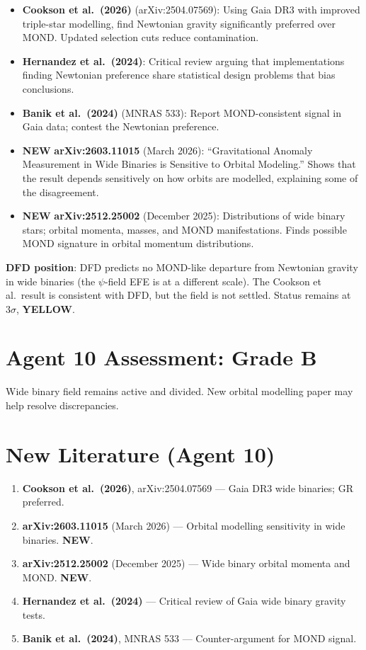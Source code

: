 \documentclass[11pt,a4paper]{article}
\newcommand{\YELLOW}{\textcolor{dfdyellow}{\textbf{YELLOW}}}
\newcommand{\NEW}{\textcolor{dfdblue}{\textbf{NEW}}}
\begin{document}
\begin{itemize}
\item \textbf{Cookson et al.\ (2026)} (arXiv:2504.07569): Using Gaia DR3 with improved triple-star modelling, find Newtonian gravity significantly preferred over MOND. Updated selection cuts reduce contamination.
\item \textbf{Hernandez et al.\ (2024)}: Critical review arguing that implementations finding Newtonian preference share statistical design problems that bias conclusions.
\item \textbf{Banik et al.\ (2024)} (MNRAS 533): Report MOND-consistent signal in Gaia data; contest the Newtonian preference.
\item \NEW{} \textbf{arXiv:2603.11015} (March 2026): ``Gravitational Anomaly Measurement in Wide Binaries is Sensitive to Orbital Modeling.'' Shows that the result depends sensitively on how orbits are modelled, explaining some of the disagreement.
\item \NEW{} \textbf{arXiv:2512.25002} (December 2025): Distributions of wide binary stars; orbital momenta, masses, and MOND manifestations. Finds possible MOND signature in orbital momentum distributions.
\end{itemize}

\textbf{DFD position}: DFD predicts no MOND-like departure from Newtonian gravity in wide binaries (the $\psi$-field EFE is at a different scale). The Cookson et al.\ result is consistent with DFD, but the field is not settled. Status remains at $3\sigma$, \YELLOW.

\section{Agent 10 Assessment: Grade B}

Wide binary field remains active and divided. New orbital modelling paper may help resolve discrepancies.

\section{New Literature (Agent 10)}

\begin{enumerate}
\item \textbf{Cookson et al.\ (2026)}, arXiv:2504.07569 --- Gaia DR3 wide binaries; GR preferred.
\item \textbf{arXiv:2603.11015} (March 2026) --- Orbital modelling sensitivity in wide binaries. \NEW.
\item \textbf{arXiv:2512.25002} (December 2025) --- Wide binary orbital momenta and MOND. \NEW.
\item \textbf{Hernandez et al.\ (2024)} --- Critical review of Gaia wide binary gravity tests.
\item \textbf{Banik et al.\ (2024)}, MNRAS 533 --- Counter-argument for MOND signal.
\end{enumerate}
\end{document}
